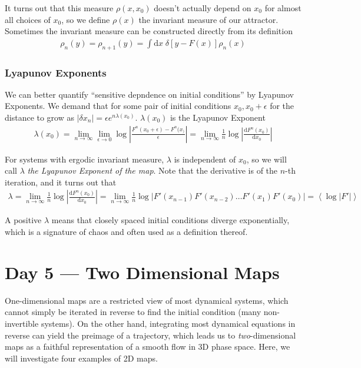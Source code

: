 \documentclass[10pt]{article}
\newcommand{\rd}[2]{\frac{\mathrm{d}#1}{\mathrm{d}#2}}
\newcommand{\abs}[1]{\left|#1\right|}
\newcommand{\expvalue}[1]{\left<#1\right>}
\begin{document}
It turns out that this measure $\rho(x,x_0)$ doesn't actually depend on $x_0$
for almost all choices of $x_0$, so we define $\rho(x)$ the invariant measure of
our attractor. Sometimes the invariant measure can be constructed directly from
its definition
\begin{align}
    \rho_n(y) = \rho_{n+1}(y) = \int \mathrm{d}x\; \delta \left[ y - F(x)
    \right]\rho_n(x)
\end{align}

\subsubsection{Lyapunov Exponents}

We can better quantify ``sensitive depndence on initial conditions'' by Lyapunov
Exponents. We demand that for some pair of initial conditions $x_0, x_0 +
\epsilon$ for the distance to grow as $\abs{\delta x_n} = \epsilon
e^{n\lambda(x_0)}$. $\lambda(x_0)$ is the Lyapunov Exponent
\begin{align}
    \lambda(x_0) = \lim_{n \to \infty}\lim_{\epsilon \to
    0}\log\abs{\frac{F^n(x_0 + \epsilon) - F^n(x_)}{\epsilon}} = \lim_{n \to
    \infty}\frac{1}{n}\log \abs{\rd{F^n(x_0)}{x_0}}
\end{align}

For systems with ergodic invariant measure, $\lambda$ is independent of $x_0$,
so we will call $\lambda$ \emph{the Lyapunov Exponent of the map}. Note that the
derivative is of the $n$-th iteration, and it turns out that
\begin{align}
    \lambda = \lim_{n \to \infty}\frac{1}{n}\log\abs{\rd{F^n(x_0)}{x_0}} =
    \lim_{n \to \infty}\frac{1}{n}\log \abs{F'(x_{n-1})F'(x_{n - 2})\dots
    F'(x_1) F'(x_0)} = \expvalue{\log\abs{F'}}
\end{align}

A positive $\lambda$ means that closely spaced initial conditions diverge
exponentially, which is a signature of chaos and often used as a definition
thereof.

\section{Day 5 --- Two Dimensional Maps}

One-dimensional maps are a restricted view of most dynamical systems, which
cannot simply be iterated in reverse to find the initial condition (many
non-invertible systems). On the other hand, integrating most dynamical equations
in reverse can yield the preimage of a trajectory, which leads us to
\emph{two}-dimensional maps as a faithful representation of a smooth flow in 3D
phase space. Here, we will investigate four examples of 2D maps.
\end{document}
